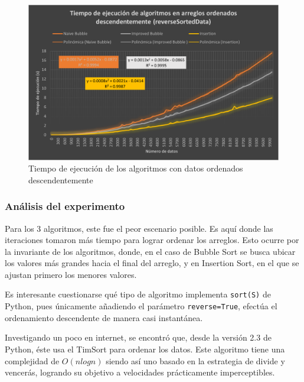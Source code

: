 \documentclass[letter]{article}
\begin{document}
\begin{figure}[h]
    \centering
    \includegraphics[scale=1]{reverseSortedDataGraphic.png}
    \caption{Tiempo de ejecución de los algoritmos con datos ordenados descendentemente}
   \label{experimentos:invertidas:grafica}
\end{figure}


\subsubsection{Análisis del experimento}
\label{experimentos:invertidas:analisis}
Para los 3 algoritmos, este fue el peor escenario posible. Es aquí donde las iteraciones tomaron más tiempo para lograr ordenar los arreglos. Esto ocurre por la invariante de los algoritmos, donde, en el caso de Bubble Sort se busca ubicar los valores más grandes hacia el final del arreglo, y en Insertion Sort, en el que se ajustan primero los menores valores.

Es interesante cuestionarse qué tipo de algoritmo implementa \texttt{sort(S)} de Python, pues únicamente añadiendo el parámetro \texttt{reverse=True}, efectúa el ordenamiento descendente de manera casi instantánea.

Investigando un poco en internet, se encontró que, \cite{Ed} desde la versión 2.3 de Python, éste usa el TimSort para ordenar los datos. Este algoritmo tiene una complejidad de $O(nlogn)$ siendo así uno basado en la estrategia de divide y vencerás, logrando su objetivo a velocidades prácticamente imperceptibles.
\end{document}
